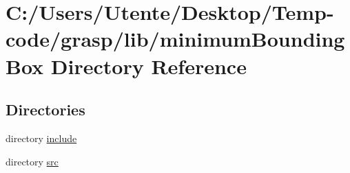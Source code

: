 \section{C\+:/\+Users/\+Utente/\+Desktop/\+Temp-\/code/grasp/lib/minimum\+Bounding\+Box Directory Reference}
\label{dir_4ddbe9f20cdf314645d6c5a25ef03f01}
\subsection*{Directories}
\begin{DoxyCompactItemize}
\item 
directory \hyperlink{dir_6907e0833d2b4b2fc4a1cc6414715885}{include}
\item 
directory \hyperlink{dir_955816ef8cdaff296bd39f9154bab580}{src}
\end{DoxyCompactItemize}
